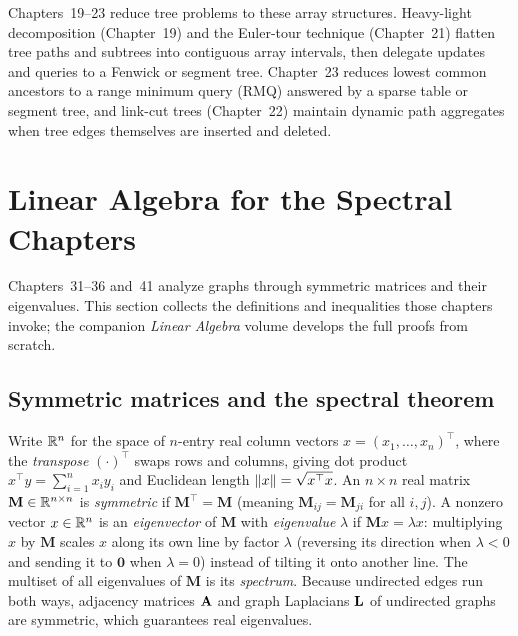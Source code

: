 \begin{connectionbox}
Chapters~19--23 reduce tree problems to these array structures. Heavy-light decomposition (Chapter~19) and the Euler-tour technique (Chapter~21) flatten tree paths and subtrees into contiguous array intervals, then delegate updates and queries to a Fenwick or segment tree. Chapter~23 reduces lowest common ancestors to a range minimum query (RMQ) answered by a sparse table or segment tree, and link-cut trees (Chapter~22) maintain dynamic path aggregates when tree edges themselves are inserted and deleted.
\end{connectionbox}

\section{Linear Algebra for the Spectral Chapters}
\label{ch42:linalg}

Chapters~31--36 and~41 analyze graphs through symmetric matrices and their eigenvalues. This section collects the definitions and inequalities those chapters invoke; the companion \emph{Linear Algebra} volume develops the full proofs from scratch.

\subsection{Symmetric matrices and the spectral theorem}

Write $\mathbb{R}^n$ for the space of $n$-entry real column vectors $x = (x_1,\dots,x_n)^\top$, where the \emph{transpose} $(\cdot)^\top$ swaps rows and columns, giving dot product $x^\top y = \sum_{i=1}^n x_i y_i$ and Euclidean length $\lVert x\rVert = \sqrt{x^\top x}$. An $n\times n$ real matrix $\mathbf{M} \in \mathbb{R}^{n\times n}$ is \emph{symmetric} if $\mathbf{M}^\top = \mathbf{M}$ (meaning $\mathbf{M}_{ij} = \mathbf{M}_{ji}$ for all $i,j$). A nonzero vector $x \in \mathbb{R}^n$ is an \emph{eigenvector} of $\mathbf{M}$ with \emph{eigenvalue} $\lambda$ if $\mathbf{M}x = \lambda x$: multiplying $x$ by $\mathbf{M}$ scales $x$ along its own line by factor $\lambda$ (reversing its direction when $\lambda < 0$ and sending it to $\mathbf{0}$ when $\lambda = 0$) instead of tilting it onto another line. The multiset of all eigenvalues of $\mathbf{M}$ is its \emph{spectrum}. Because undirected edges run both ways, adjacency matrices $\mathbf{A}$ and graph Laplacians $\mathbf{L}$ of undirected graphs are symmetric, which guarantees real eigenvalues.

